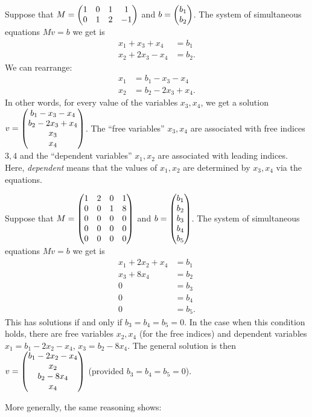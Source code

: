 \documentclass{article}
\begin{document}
\begin{Example}
Suppose that \(M=\begin{pmatrix} 1 & 0 & 1 & 1 \\ 0 & 1 & 2 & -1\end{pmatrix}\) and
\(b=\begin{pmatrix} b_1 \\ b_2\end{pmatrix}\). The system of simultaneous equations
\(Mv=b\) we get is
\begin{align*}
x_1+x_3+x_4&=b_1\\
x_2+2x_3-x_4&=b_2.
\end{align*}
We can rearrange:
\begin{align*}
x_1&=b_1-x_3-x_4\\
x_2&=b_2-2x_3+x_4.
\end{align*}
In other words, for every value of the variables \(x_3,x_4\), we get
a solution \(v=\begin{pmatrix} b_1-x_3-x_4\\ b_2-2x_3+x_4\\ x_3\\ x_4\end{pmatrix}\). The
``free variables'' \(x_3,x_4\) are associated with free indices
\(3,4\) and the ``dependent variables'' \(x_1,x_2\) are associated
with leading indices. Here, {\em dependent} means that the values of
\(x_1,x_2\) are determined by \(x_3,x_4\) via the equations.


\end{Example}
\begin{Example}
Suppose that \(M=\begin{pmatrix} 1 & 2 & 0 & 1 \\ 0 & 0 & 1 & 8 \\ 0 & 0 & 0 & 0
\\ 0 & 0 & 0 & 0 \\ 0 & 0 & 0 & 0\end{pmatrix}\) and \(b=\begin{pmatrix}
b_1\\ b_2\\ b_3\\ b_4\\ b_5\end{pmatrix}\). The system of simultaneous
equations \(Mv=b\) we get is
\begin{align*}
x_1+2x_2+x_4&=b_1\\
x_3+8x_4&=b_2\\
0&=b_3\\
0&=b_4\\
0&=b_5.
\end{align*}
This has solutions if and only if \(b_3=b_4=b_5=0\). In the case
when this condition holds, there are free variables \(x_2,x_4\) (for
the free indices) and dependent variables \(x_1=b_1-2x_2-x_4\),
\(x_3=b_2-8x_4\). The general solution is then \(v=\begin{pmatrix}
b_1-2x_2-x_4\\ x_2\\b_2-8x_4\\x_4\end{pmatrix}\) (provided \(b_3=b_4=b_5=0\)).


\end{Example}
More generally, the same reasoning shows:
\end{document}

